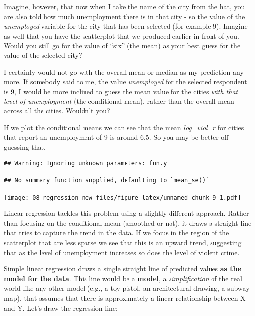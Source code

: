 \documentclass[
]{book}
\begin{document}
Imagine, however, that now when I take the name of the city from the hat, you are also told how much unemployment there is in that city - so the value of the \emph{unemployed} variable for the city that has been selected (for example 9). Imagine as well that you have the scatterplot that we produced earlier in front of you. Would you still go for the value of ``six'' (the mean) as your best guess for the value of the selected city?

I certainly would not go with the overall mean or median as my prediction any more. If somebody said to me, the value \emph{unemployed} for the selected respondent is 9, I would be more inclined to guess the mean value for the cities \emph{with that level of unemployment} (the conditional mean), rather than the overall mean across all the cities. Wouldn't you?

If we plot the conditional means we can see that the mean \emph{log\_viol\_r} for cities that report an unemployment of 9 is around 6.5. So you may be better off guessing that.

\begin{verbatim}
## Warning: Ignoring unknown parameters: fun.y
\end{verbatim}

\begin{verbatim}
## No summary function supplied, defaulting to `mean_se()`
\end{verbatim}

\texttt{[image: 08-regression\_new\_files/figure-latex/unnamed-chunk-9-1.pdf]}

Linear regression tackles this problem using a slightly different approach. Rather than focusing on the conditional mean (smoothed or not), it draws a straight line that tries to capture the trend in the data. If we focus in the region of the scatterplot that are less sparse we see that this is an upward trend, suggesting that as the level of unemployment increases so does the level of violent crime.

Simple linear regression draws a single straight line of predicted values \textbf{as the model for the data}. This line would be a \textbf{model}, a \emph{simplification} of the real world like any other model (e.g., a toy pistol, an architectural drawing, a subway map), that assumes that there is approximately a linear relationship between X and Y. Let's draw the regression line:
\end{document}
